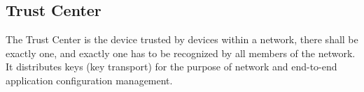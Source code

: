 \subsection{Trust Center}
The Trust Center is the device trusted by devices within
a network, there shall be exactly one, and exactly one has to be recognized by all members of the network.
It distributes keys (key transport) for the purpose of
network and end-to-end application configuration
management.

      
   
